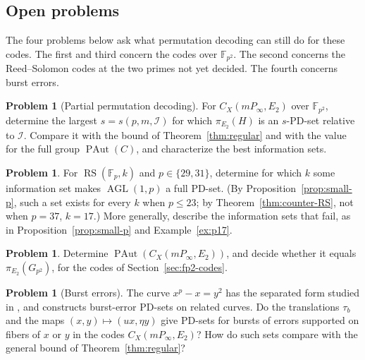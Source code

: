 \documentclass[12pt,letterpaper]{article}
\theoremstyle{definition}
\newtheorem{problem}[theorem]{Problem}
\theoremstyle{remark}
\numberwithin{equation}{section}
\newcommand{\F}{\mathbb{F}}
\newcommand{\RS}{\operatorname{RS}}
\newcommand{\PAut}{\operatorname{PAut}}
\newcommand{\AGL}{\operatorname{AGL}}
\newcommand{\cI}{\mathcal{I}}
\begin{document}
\subsection{Open problems}

The four problems below ask what permutation decoding can still do for
these codes. The first and third concern the codes over $\F_{p^2}$. The
second concerns the Reed--Solomon codes at the two primes not yet
decided. The fourth concerns burst errors.

\begin{problem}[Partial permutation decoding]\label{prob:partial}
For $C_X(mP_\infty,E_2)$ over $\F_{p^2}$, determine the largest
$s=s(p,m,\cI)$ for which $\pi_{E_2}(H)$ is an $s$-PD-set relative to
$\cI$.  Compare it with the bound of Theorem~\ref{thm:regular} and with
the value for the full group $\PAut(C)$, and characterize the best
information sets.
\end{problem}

\begin{problem}
For $\RS(\F_p,k)$ and $p\in\{29,31\}$, determine for which $k$ some
information set makes $\AGL(1,p)$ a full PD-set.  (By
Proposition~\ref{prop:small-p}, such a set exists for every $k$ when
$p\le23$; by Theorem~\ref{thm:counter-RS}, not when $p=37$, $k=17$.)  More generally,
describe the information sets that fail, as in
Proposition~\ref{prop:small-p} and Example~\ref{ex:p17}.
\end{problem}

\begin{problem}\label{prob:paut}
Determine $\PAut(C_X(mP_\infty,E_2))$, and decide whether it equals
$\pi_{E_2}(G_{p^2})$, for the codes of Section~\ref{sec:fp2-codes}.
\end{problem}

\begin{problem}[Burst errors]\label{prob:burst}
The curve $x^p-x=y^2$ has the separated form studied in \cite{CTO26}, and
\cite{LLMS26} constructs burst-error PD-sets on related curves.  Do the
translations $\tau_b$ and the maps $(x,y)\mapsto(ux,\eta y)$ give
PD-sets for bursts of errors supported on fibers of $x$ or $y$ in the
codes $C_X(mP_\infty,E_2)$?  How do such sets compare with the general
bound of Theorem~\ref{thm:regular}?
\end{problem}

\appendix
\end{document}
